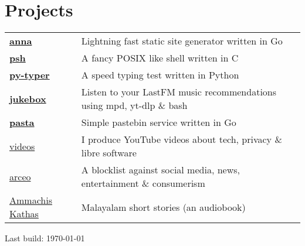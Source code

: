 \documentclass[letter,12pt]{article}
\begin{document}
\section{Projects}
\begin{tabularx}{\linewidth}{@{}l X@{}}
    \textbf{\href{https://github.com/anna-ssg/anna}{anna}} & Lightning fast static site generator written in Go \\
    \textbf{\href{https://github.com/psh-shell/psh}{psh}} & A fancy POSIX like shell written in C \\
    \textbf{\href{https://github.com/polarhive/py-typer}{py-typer}} & A speed typing test written in Python \\
    \textbf{\href{https://github.com/polarhive/jukebox}{jukebox}} & Listen to your LastFM music recommendations using mpd, yt-dlp \& bash \\
    \textbf{\href{https://polarhive.net/pasta}{pasta}} & Simple pastebin service written in Go \\
    \href{https://polarhive.net/videos}{videos} & I produce YouTube videos about tech, privacy \& libre software \\
    \href{https://polarhive.net/arceo}{arceo} & A blocklist against social media, news, entertainment \& consumerism \\
    \href{https://polarhive.net/ammachiskathas}{Ammachis Kathas} & Malayalam short stories (an audiobook) \\
\end{tabularx}

\vfill
\href{https://github.com/polarhive/resume}{} Last build: \today
\end{document}
